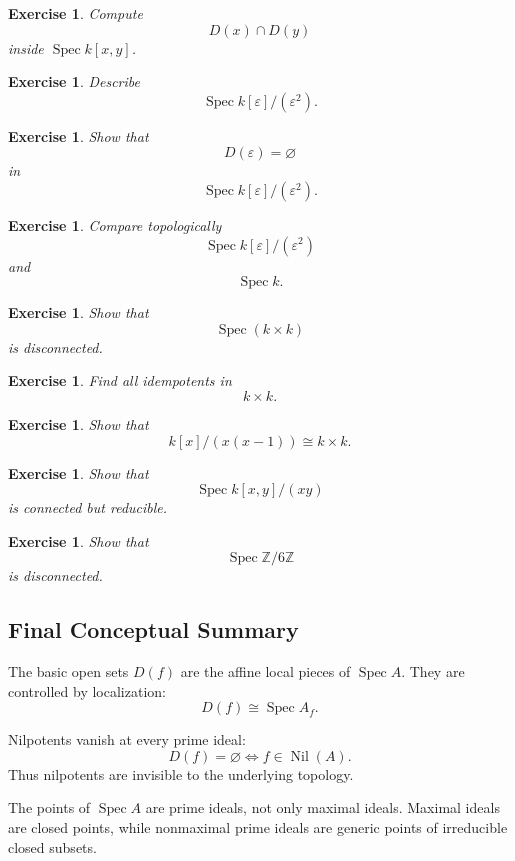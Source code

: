 \documentclass[12pt,a4paper]{article}
\newtheorem{exercise}[definition]{Exercise}
\newcommand{\Z}{\mathbb{Z}}
\newcommand{\Spec}{\operatorname{Spec}}
\newcommand{\Nil}{\operatorname{Nil}}
\begin{document}
\begin{exercise}
	Compute
	\[
	D(x)\cap D(y)
	\]
	inside \(\Spec k[x,y]\).
\end{exercise}

\begin{exercise}
	Describe
	\[
	\Spec k[\varepsilon]/(\varepsilon^2).
	\]
\end{exercise}

\begin{exercise}
	Show that
	\[
	D(\varepsilon)=\varnothing
	\]
	in
	\[
	\Spec k[\varepsilon]/(\varepsilon^2).
	\]
\end{exercise}

\begin{exercise}
	Compare topologically
	\[
	\Spec k[\varepsilon]/(\varepsilon^2)
	\]
	and
	\[
	\Spec k.
	\]
\end{exercise}

\begin{exercise}
	Show that
	\[
	\Spec(k\times k)
	\]
	is disconnected.
\end{exercise}

\begin{exercise}
	Find all idempotents in
	\[
	k\times k.
	\]
\end{exercise}

\begin{exercise}
	Show that
	\[
	k[x]/(x(x-1))\cong k\times k.
	\]
\end{exercise}

\begin{exercise}
	Show that
	\[
	\Spec k[x,y]/(xy)
	\]
	is connected but reducible.
\end{exercise}

\begin{exercise}
	Show that
	\[
	\Spec \Z/6\Z
	\]
	is disconnected.
\end{exercise}

\subsection{Final Conceptual Summary}

The basic open sets \(D(f)\) are the affine local pieces of \(\Spec A\). They
are controlled by localization:
\[
D(f)\cong \Spec A_f.
\]

Nilpotents vanish at every prime ideal:
\[
D(f)=\varnothing
\iff
f\in\Nil(A).
\]
Thus nilpotents are invisible to the underlying topology.

The points of \(\Spec A\) are prime ideals, not only maximal ideals. Maximal
ideals are closed points, while nonmaximal prime ideals are generic points of
irreducible closed subsets.
\end{document}
